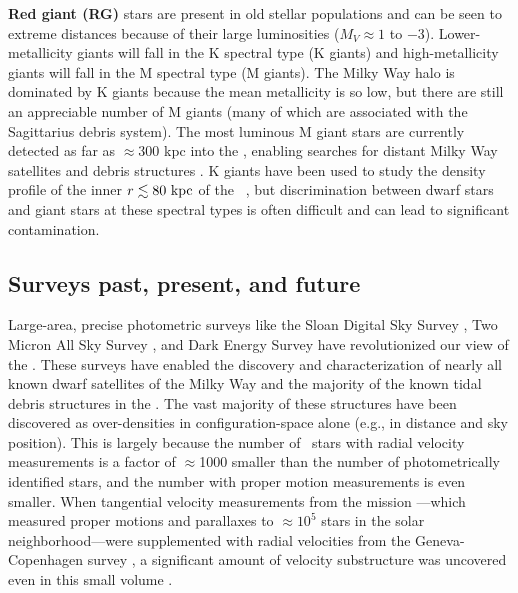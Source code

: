 {\bf Red giant (RG)} stars are present in old stellar populations and can be
seen to extreme distances because of their large luminosities ($M_V \approx 1$
to $-3$). Lower-metallicity giants will fall in the K spectral type (K giants)
and high-metallicity giants will fall in the M spectral type (M giants). The
Milky Way halo is dominated by K giants because the mean metallicity is so low,
but there are still an appreciable number of M giants (many of which are
associated with the Sagittarius debris system). The most luminous M giant stars
are currently detected as far as $\approx$300 kpc into the \mwhalo, enabling
searches for distant Milky Way satellites and debris structures
\citep{bochanski14}. K giants have been used to study the density profile of the
inner $r \lesssim 80~\mathrm{kpc}$ of the \mwhalo\ \citep{xue15}, but discrimination
between dwarf stars and giant stars at these spectral types is often difficult
and can lead to significant contamination.

\subsection{Surveys past, present, and future}

Large-area, precise photometric surveys like the Sloan Digital Sky Survey
\citep[SDSS;][]{york00}, Two Micron All Sky Survey
\citep[2MASS;][]{skrutskie06}, and Dark Energy Survey \citep[DES;][]{flaugher12}
have revolutionized our view of the \mwhalo. These surveys have enabled the
discovery and characterization of nearly all known dwarf satellites of the Milky
Way and the majority of the known tidal debris structures in the \mwhalo. The
vast majority of these structures have been discovered as over-densities in
configuration-space alone (e.g., in distance and sky position). This is largely
because the number of \mwhalo\ stars with radial velocity measurements is a
factor of $\approx$1000 smaller than the number of photometrically identified
stars, and the number with proper motion measurements is even smaller. When
tangential velocity measurements from the  mission
\citep{perryman97}---which measured proper motions and parallaxes to
$\approx$$10^5$ stars in the solar neighborhood---were supplemented with radial
velocities from the Geneva-Copenhagen survey \citep{nordstrom04}, a significant
amount of velocity substructure was uncovered even in this small volume
\citep[e.g.,][]{bovy09, minchev10}.

